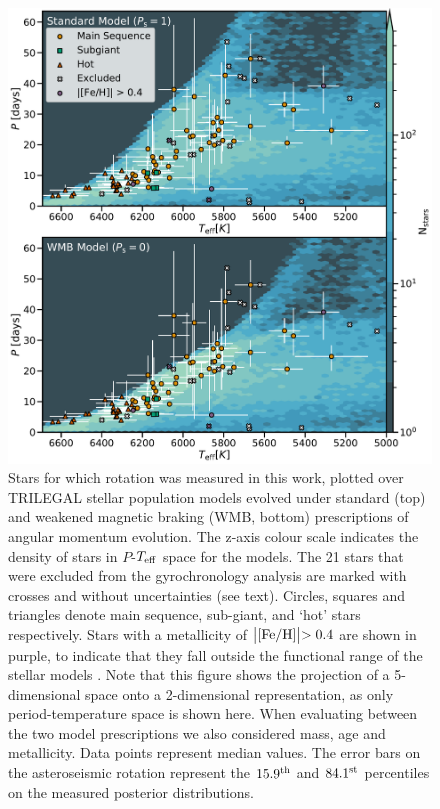 \documentclass[12pt]{article}
\newcommand{\teff}{\mbox{$T_{\rm eff}$}\xspace}
\newcommand{\feh}{\mbox{$\rm{[Fe/H]}$}\xspace}
\newcommand{\rtwo}[1]{{#1}}
\begin{document}
\begin{figure}
	\centering
	\includegraphics[width=.9\textwidth]{fullsample.pdf}
	\caption{Stars for which rotation was measured in this work, plotted over TRILEGAL \cite{girardi+2012} stellar population models evolved under standard (top) and weakened magnetic braking (WMB, bottom) prescriptions of angular momentum evolution. \rtwo{The z-axis colour scale indicates the density of stars in $P$-\teff space for the models.} The 21 stars that were excluded from the gyrochronology analysis are marked with crosses and without uncertainties (see text). Circles, squares and triangles denote main sequence, sub-giant, and `hot' stars respectively. Stars with a metallicity of $\bigl\lvert \feh \bigl\rvert > 0.4$ are shown in purple, to indicate that they fall outside the functional range of the stellar models  \cite{vansaders+2019}. Note that this figure shows the projection of a 5-dimensional space onto a 2-dimensional representation, as only period-temperature space is shown here. When evaluating between the two model prescriptions we also considered mass, age and metallicity. Data points represent median values. The error bars on the asteroseismic rotation represent the $15.9^{\rm th}$ and $84.1^{\rm st}$ percentiles on the measured posterior distributions.}
	\label{fig:fullsample}
\end{figure}
\end{document}
